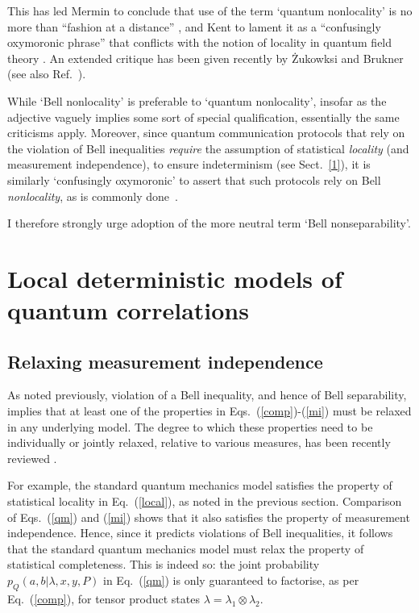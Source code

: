 \documentclass[graybox]{svmult}
\begin{document}
This has led Mermin to conclude
that use of the term `quantum nonlocality' is no more
than ``fashion at a distance'' \cite{mermin}, and Kent to lament
it as a ``confusingly oxymoronic phrase'' that conflicts with
the notion of locality in quantum field theory \cite{kent}. An extended critique has  been given recently by \.Zukowksi and Brukner \cite{zb} (see also Ref.~\cite{hallgisin}).

While `Bell nonlocality' is preferable to `quantum nonlocality', insofar as the adjective vaguely implies some sort of special qualification, essentially the same criticisms apply. Moreover, since quantum communication protocols that rely on the violation of Bell inequalities {\it require} the assumption of statistical {\it locality} (and measurement independence), to ensure indeterminism (see Sect.~\ref{1}), it is similarly `confusingly oxymoronic' to assert that such protocols rely on Bell {\it nonlocality}, as is commonly done~\cite{bellreview}. 

I therefore strongly urge adoption of the more neutral term `Bell nonseparability'. 

\section{Local deterministic models of quantum correlations}
\label{4}

\subsection{Relaxing measurement independence}

As noted previously, violation of a Bell inequality, and hence of Bell separability, implies that at least one of the properties in Eqs.~(\ref{comp})-(\ref{mi}) must be relaxed in any underlying model. The degree to which these properties need to be individually or jointly relaxed, relative to various measures, has been recently reviewed \cite{relaxed}.

For example, the standard quantum mechanics model satisfies the property of statistical locality in Eq.~(\ref{local}), as noted in the previous section. Comparison of Eqs.~(\ref{qm}) and (\ref{mi}) shows that it also satisfies the property of measurement independence.  Hence, since it predicts violations of Bell inequalities, it follows that the standard quantum mechanics model must relax the property of statistical completeness. This is indeed so: the joint probability $p_Q(a,b|\lambda,x,y,P)$ in Eq.~(\ref{qm}) is only guaranteed to factorise, as per Eq.~(\ref{comp}), for tensor product states $\lambda=\lambda_1\otimes \lambda_2$.  
\end{document}

